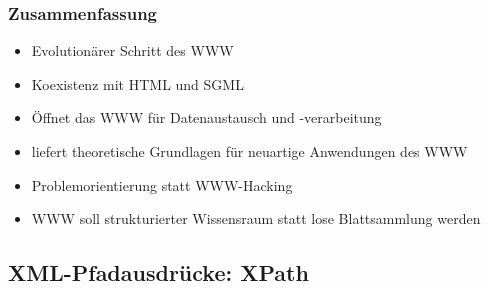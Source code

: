 \subsubsection{Zusammenfassung}
\begin{itemize}
	\item Evolutionärer Schritt des WWW
	\item Koexistenz mit HTML und SGML
	\item Öffnet das WWW für Datenaustausch und -verarbeitung
	\item liefert theoretische Grundlagen für neuartige Anwendungen des WWW
	\item Problemorientierung statt WWW-Hacking
	\item WWW soll strukturierter Wissensraum statt lose Blattsammlung werden
\end{itemize}


\subsection{XML-Pfadausdrücke: XPath}